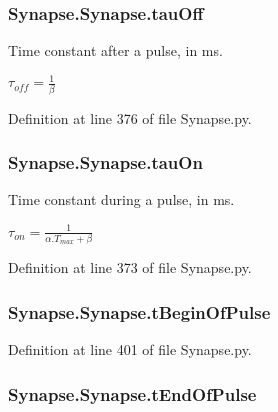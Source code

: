 \subsubsection[{\texorpdfstring{tau\+Off}{tauOff}}]{\setlength{\rightskip}{0pt plus 5cm}Synapse.\+Synapse.\+tau\+Off}\hypertarget{class_synapse_1_1_synapse_afd5638a223c3fdcc672002dbced7bed0}{}\label{class_synapse_1_1_synapse_afd5638a223c3fdcc672002dbced7bed0}


Time constant after a pulse, in ms. 

$\tau_{off}=\frac{1}{\beta}$ 

Definition at line 376 of file Synapse.\+py.

\subsubsection[{\texorpdfstring{tau\+On}{tauOn}}]{\setlength{\rightskip}{0pt plus 5cm}Synapse.\+Synapse.\+tau\+On}\hypertarget{class_synapse_1_1_synapse_aae46f8edd1e94ea2ab51e3612afd3a3f}{}\label{class_synapse_1_1_synapse_aae46f8edd1e94ea2ab51e3612afd3a3f}


Time constant during a pulse, in ms. 

$\tau_{on}=\frac{1}{\alpha.T_{max} +\beta}$ 

Definition at line 373 of file Synapse.\+py.

\subsubsection[{\texorpdfstring{t\+Begin\+Of\+Pulse}{tBeginOfPulse}}]{\setlength{\rightskip}{0pt plus 5cm}Synapse.\+Synapse.\+t\+Begin\+Of\+Pulse}\hypertarget{class_synapse_1_1_synapse_acdc426c52a2a13183d5f8c54a830bfa2}{}\label{class_synapse_1_1_synapse_acdc426c52a2a13183d5f8c54a830bfa2}


Definition at line 401 of file Synapse.\+py.

\subsubsection[{\texorpdfstring{t\+End\+Of\+Pulse}{tEndOfPulse}}]{\setlength{\rightskip}{0pt plus 5cm}Synapse.\+Synapse.\+t\+End\+Of\+Pulse}\hypertarget{class_synapse_1_1_synapse_adfd02fa815d45efd0cb1bc0124fe2c90}{}\label{class_synapse_1_1_synapse_adfd02fa815d45efd0cb1bc0124fe2c90}


